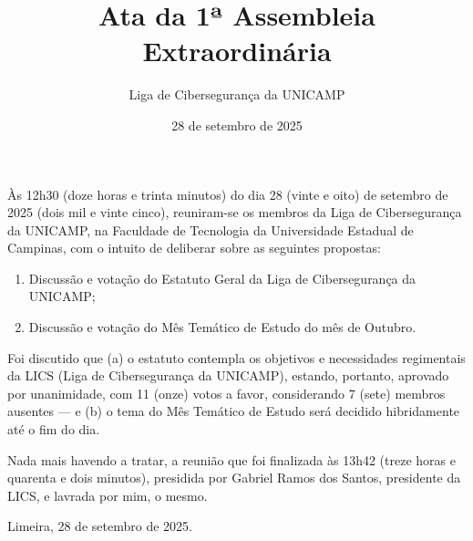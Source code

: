 \documentclass[12pt, a4paper]{article}
\title{Ata da 1ª Assembleia Extraordinária}
\author{Liga de Cibersegurança da UNICAMP}
\date{28 de setembro de 2025}
\begin{document}
\maketitle

Às 12h30 (doze horas e trinta minutos) do dia 28 (vinte e oito) de setembro de 2025 (dois mil e vinte cinco), reuniram-se os membros da Liga de Cibersegurança da UNICAMP, na Faculdade de Tecnologia da Universidade Estadual de Campinas, com o intuito de deliberar sobre as seguintes propostas:

\vspace{0.25cm}

\begin{enumerate}[label=\arabic*.]
    \item Discussão e votação do Estatuto Geral da Liga de Cibersegurança da UNICAMP;
    \item Discussão e votação do Mês Temático de Estudo do mês de Outubro.
\end{enumerate}

\vspace{0.25cm}

Foi discutido que (a) o estatuto contempla os objetivos e necessidades regimentais da LICS (Liga de Cibersegurança da UNICAMP), estando, portanto, aprovado por unanimidade, com 11 (onze) votos a favor, considerando 7 (sete) membros ausentes --- e (b) o tema do Mês Temático de Estudo será decidido hibridamente até o fim do dia.

\vspace{0.5cm}

Nada mais havendo a tratar, a reunião que foi finalizada às 13h42 (treze horas e quarenta e dois minutos), presidida por Gabriel Ramos dos Santos, presidente da LICS, e lavrada por mim, o mesmo.

\bigskip
\bigskip
\begin{center}
    Limeira, 28 de setembro de 2025.
\end{center}

\vspace*{\fill}
\end{document}
